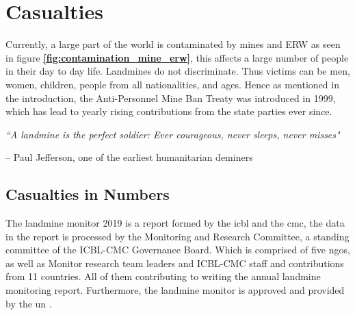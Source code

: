 \setlength{\parindent}{0pt}
\chapter{Casualties} \label{chap:casualties}

Currently, a large part of the world is contaminated by mines and ERW as seen in figure \textbf{\ref{fig:contamination_mine_erw}}, this affects a large number of people in their day to day life. Landmines do not discriminate. Thus victims can be men, women, children, people from all nationalities, and ages. Hence as mentioned in the introduction, the Anti-Personnel Mine Ban Treaty was introduced in 1999, which has lead to yearly rising contributions from the state parties ever since. \cite{LandmineMonitor2019} 

        \vspace{5mm}

\begin{centering}

\textit{\large “A landmine is the perfect soldier: Ever courageous, never sleeps, never misses"}\\

\begin{flushright}

        \vspace{-3mm}
        
-- Paul Jefferson, one of the earliest humanitarian deminers \hspace{4mm}

\end{flushright}
\end{centering}


\section{Casualties in Numbers}


The landmine monitor 2019 is a report formed by the \gls{icbl} and the \gls{cmc}, the data in the report is processed by the Monitoring and Research Committee, a standing committee of the ICBL-CMC Governance Board. Which is comprised of five \gls{ngo}s, as well as Monitor research team leaders and ICBL-CMC staff and contributions from 11 countries. All of them contributing to writing the annual landmine monitoring report. Furthermore, the landmine monitor is approved and provided by the \gls{un} \cite{LandmineMonitor2019}.

